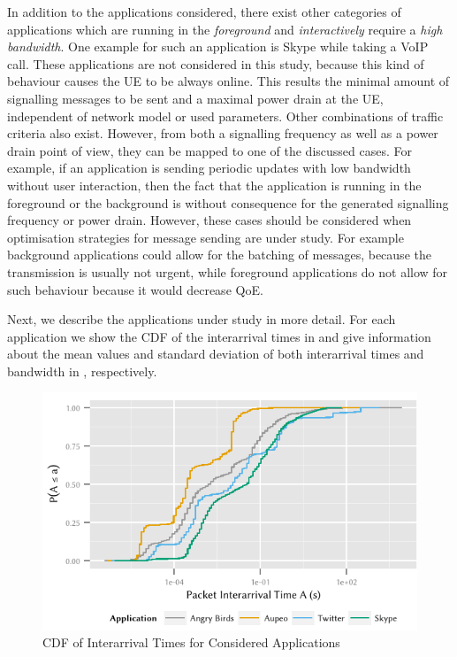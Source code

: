 In addition to the applications considered, there exist other categories of applications which are running in the \emph{foreground} and \emph{interactively} require a \emph{high bandwidth}.
One example for such an application is Skype while taking a \gls{VoIP} call.
These applications are not considered in this study, because this kind of behaviour causes the \gls{UE} to be always online.
This results the minimal amount of signalling messages to be sent and a maximal power drain at the \gls{UE}, independent of network model or used parameters.
Other combinations of traffic criteria also exist.
However, from both a signalling frequency as well as a power drain point of view, they can be mapped to one of the discussed cases.
For example, if an application is sending periodic updates with low bandwidth without user interaction, then the fact that the application is running in the foreground or the background is without consequence for the generated signalling frequency or power drain.
However, these cases should be considered when optimisation strategies for message sending are under study.
For example background applications could allow for the batching of messages, because the transmission is usually not urgent, while foreground applications do not allow for such behaviour because it would decrease \gls{QoE}.

Next, we describe the applications under study in more detail.
For each application we show the \gls{CDF} of the interarrival times in  and give information about the mean values and standard deviation of both interarrival times and bandwidth in , respectively.

\begin{figure}
\centering
\includegraphics{network/network_traces/numerical_results/figures/interarrival_times}
\caption{CDF of Interarrival Times for Considered Applications}\label{fig:network:network_traces:numerical_results:traffic:interarrival_times}
\end{figure}

